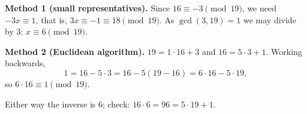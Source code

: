 \textbf{Method 1 (small representatives).} Since $16\equiv-3\pmod{19}$, we need $-3x\equiv1$, that is, $3x\equiv-1\equiv18\pmod{19}$. As $\gcd(3,19)=1$ we may divide by $3$: $x\equiv6\pmod{19}$.

\textbf{Method 2 (Euclidean algorithm).} $19=1\cdot16+3$ and $16=5\cdot3+1$. Working backwards,
\[1=16-5\cdot3=16-5(19-16)=6\cdot16-5\cdot19,\]
so $6\cdot16\equiv1\pmod{19}$.

Either way the inverse is $\boxed{6}$; check: $16\cdot6=96=5\cdot19+1$.
